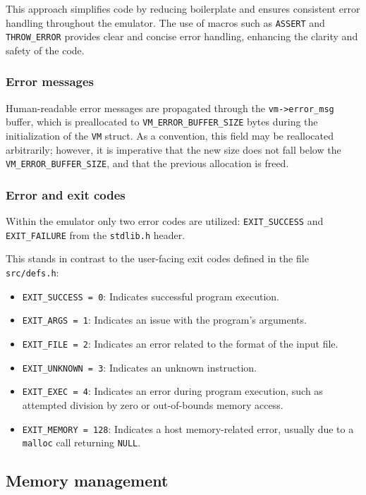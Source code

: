 \documentclass[12pt,a4paper,final]{article}
\newcommand{\code}[1]{\texttt{#1}}
\begin{document}
This approach simplifies code by reducing boilerplate and ensures consistent
error handling throughout the emulator. The use of macros such as \code{ASSERT}
and \code{THROW_ERROR} provides clear and concise error handling, enhancing the
clarity and safety of the code.

\subsubsection{Error messages}
\label{sec:errormessages}

Human-readable error messages are propagated through the \code{vm->error_msg}
buffer, which is preallocated to \code{VM_ERROR_BUFFER_SIZE} bytes during the
initialization of the \code{VM} struct. As a convention, this field may be
reallocated arbitrarily; however, it is imperative that the new size does not
fall below the \code{VM_ERROR_BUFFER_SIZE}, and that the previous allocation is
freed.

\subsubsection{Error and exit codes}
\label{sec:errorcodes}

Within the emulator only two error codes are utilized: \code{EXIT_SUCCESS} and
\code{EXIT_FAILURE} from the \code{stdlib.h} header.

This stands in contrast to the user-facing exit codes defined in the file
\code{src/defs.h}:

\begin{itemize}
    \item \code{EXIT_SUCCESS = 0}: Indicates successful program execution.
    \item \code{EXIT_ARGS = 1}: Indicates an issue with the program's arguments.
    \item \code{EXIT_FILE = 2}: Indicates an error related to the format of the
        input file.
    \item \code{EXIT_UNKNOWN = 3}: Indicates an unknown instruction.
    \item \code{EXIT_EXEC = 4}: Indicates an error during program execution,
        such as attempted division by zero or out-of-bounds memory access.
    \item \code{EXIT_MEMORY = 128}: Indicates a host memory-related error,
        usually due to a \code{malloc} call returning \code{NULL}.
\end{itemize}


\subsection{Memory management}
\end{document}
